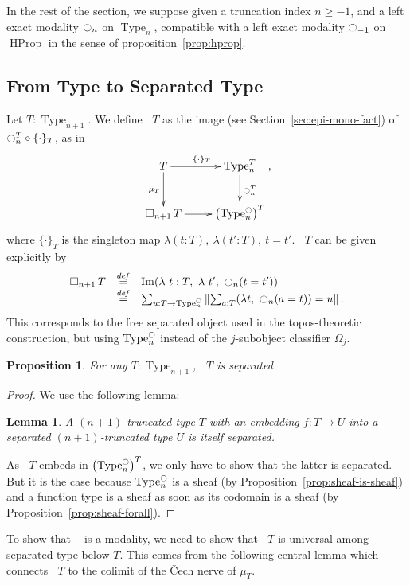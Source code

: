 \documentclass[conference]{IEEEtran}
\newtheorem{prop}[thm]{Proposition}
\newtheorem{lem}[thm]{Lemma}
\newcommand \defeq {\overset{de\hspace{-0.2ex}f}{=}}
\DeclareMathOperator{\Type}{Type}
\DeclareMathOperator{\HProp}{HProp}
\DeclareMathOperator{\im}{Im}
\newcommand{\modal}{\ensuremath{\ocircle}}
\newcommand \separated {\mathop{\square_{n+1}} }
\begin{document}
In the rest of the section, we suppose given a truncation index
$n\geqslant -1$, and a left exact modality $\modal_n$ on $\Type_n$,
compatible with a left exact modality $\modal_{-1}$ on $\HProp$ in the
sense of proposition~\ref{prop:hprop}.

\subsection{From Type to Separated Type}
\label{ssec:from-type-separated}

Let $T : \Type_{n+1}$. We define $\separated T$ as the image (see
Section~\ref{sec:epi-mono-fact}) of
$\modal_n^T \circ \{\cdot\}_T$, as in
$$\xymatrix{
  T \ar[r]^{\{\cdot\}_T} \ar[d]_{\mu_T} & \Type_n^T \ar[d]^{\modal_n^T} \\
  \separated T \ar[r]& \left( \Type_n^\modal \right)^T
}, $$
where $\{\cdot\}_T$ is the singleton map $\lambda (t:T),~\lambda
(t':T),~t=t'$.
%
$\separated T$ can be given explicitly by
%
$$
\begin{array}{rcl}
\separated T &\defeq & \im (\lambda~t:T,~\lambda~ t',~ \modal_n (t = t')) \\
          & \defeq & \sum_{u:T \to \Type_n^\modal} \left\| \sum_{a:T} 
            (\lambda t,~\modal_n (a=t)) = u\right\|.
\end{array}
$$
%
This corresponds to the free separated object used in the topos-theoretic construction, but using $\Type_n^\modal$ instead of the
$j$-subobject classifier $\Omega_j$.
%
\begin{prop}
  For any $T:\Type_{n+1}$, $\separated T$ is separated.  
\end{prop}

\begin{proof}
We use the following lemma:
\begin{lem}
  A $(n+1)$-truncated type $T$ with an embedding $f : T \to U$
  into a separated $(n+1)$-truncated type $U$ is itself separated.
\end{lem}
As $\separated T$ embeds in $\left( \Type_n^\modal \right)^T$, we only
have to show that the latter is separated. But it is the case because
$\Type_n^\modal$ is a sheaf (by Proposition~\ref{prop:sheaf-is-sheaf})
and a function type is a sheaf as soon
as its codomain is a sheaf (by Proposition~\ref{prop:sheaf-forall}).
\end{proof}

To show that $\separated$ is a modality, we need to show that $\separated T$
is universal among separated type below $T$. This comes from the
following central lemma which connects $\separated T$ to the colimit of
the \v{C}ech nerve of $\mu_T$.
\end{document}
